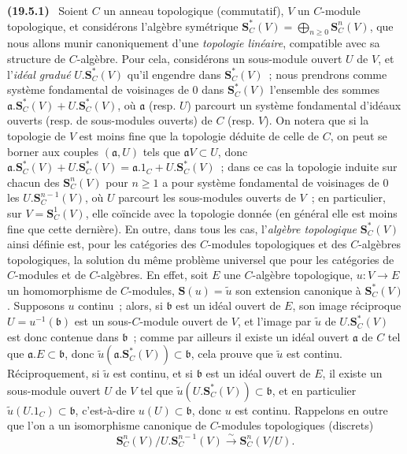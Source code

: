 \documentclass[10pt,oneside]{book}
\makeatletter
\newcommand{\setmanualcurrentlabel}[1]{\def\@currentlabel{#1}}
\newcommand{\oldpage}[2][]{%
  \setcounter{footnote}{0}%
  \marginpar{\scriptsize\textbf{#1}~|~#2}\ignorespaces}
\newenvironment{env}[1][]{\setmanualcurrentlabel{#1}\par\medskip\noindent\textbf{(#1)}\ }{\par}
\makeatother
\begin{document}
\begin{env}[19.5.1]
\label{0.19.5.1-fr}
\oldpage[0\textsubscript{IV-1}]{90}
Soient $C$ un anneau topologique (commutatif), $V$ un $C$-module topologique,
et considérons l'algèbre symétrique
$\mathbf S_C^*(V)=\bigoplus_{n\geq0}\mathbf S_C^n(V)$, que nous allons munir
canoniquement d'une \emph{topologie linéaire}, compatible avec sa structure de
$C$-algèbre. Pour cela, considérons un sous-module ouvert $U$ de $V$, et
l'\emph{idéal gradué} $U.\mathbf S_C^*(V)$ qu'il engendre dans
$\mathbf S_C^*(V)$~; nous prendrons comme système fondamental de voisinages de
$0$ dans $\mathbf S_C^*(V)$ l'ensemble des sommes
$\mathfrak a.\mathbf S_C^*(V)+U.\mathbf S_C^*(V)$, où $\mathfrak a$ (resp.
$U$) parcourt un système fondamental d'idéaux ouverts (resp. de sous-modules
ouverts) de $C$ (resp. $V$). On notera que si la topologie de $V$ est moins
fine que la topologie déduite de celle de $C$, on peut se borner aux couples
$(\mathfrak a,U)$ tels que $\mathfrak aV\subset U$, donc
$\mathfrak a.\mathbf S_C^*(V)+U.\mathbf S_C^*(V)
=\mathfrak a.1_C+U.\mathbf S_C^*(V)$~; dans ce cas la topologie induite sur
chacun des $\mathbf S_C^n(V)$ pour $n\geq1$ a pour système fondamental de
voisinages de $0$ les $U.\mathbf S_C^{n-1}(V)$, où $U$ parcourt les
sous-modules ouverts de $V$~; en particulier, sur $V=\mathbf S_C^1(V)$, elle
coïncide avec la topologie donnée (en général elle est moins fine que cette
dernière). En outre, dans tous les cas, l'\emph{algèbre topologique}
$\mathbf S_C^*(V)$ ainsi définie est, pour les catégories des $C$-modules
topologiques et des $C$-algèbres topologiques, la solution du même problème
universel que pour les catégories de $C$-modules et de $C$-algèbres. En effet,
soit $E$ une $C$-algèbre topologique, $u:V\to E$ un homomorphisme de
$C$-modules, $\mathbf S(u)=\widetilde u$ son extension canonique à
$\mathbf S_C^*(V)$. Supposons $u$ continu~; alors, si $\mathfrak b$ est un
idéal ouvert de $E$, son image réciproque $U=u^{-1}(\mathfrak b)$ est un
sous-$C$-module ouvert de $V$, et l'image par $\widetilde u$ de
$U.\mathbf S_C^*(V)$ est donc contenue dans $\mathfrak b$~; comme par ailleurs
il existe un idéal ouvert $\mathfrak a$ de $C$ tel que
$\mathfrak a.E\subset\mathfrak b$, donc
$\widetilde u(\mathfrak a.\mathbf S_C^*(V))\subset\mathfrak b$, cela prouve
que $\widetilde u$ est continu. Réciproquement, si $\widetilde u$ est continu,
et si $\mathfrak b$ est un idéal ouvert de $E$, il existe un sous-module ouvert
$U$ de $V$ tel que $\widetilde u(U.\mathbf S_C^*(V))\subset\mathfrak b$, et en
particulier $\widetilde u(U.1_C)\subset\mathfrak b$, c'est-à-dire
$u(U)\subset\mathfrak b$, donc $u$ est continu. Rappelons en outre que l'on a
un isomorphisme canonique de $C$-modules topologiques (discrets)
\begin{equation}
\label{0.19.5.1.1-fr}
  \mathbf S_C^n(V)/U.\mathbf S_C^{n-1}(V)
  \xrightarrow{\sim}\mathbf S_C^n(V/U).
  \tag{19.5.1.1}
\end{equation}
\end{env}
\end{document}
